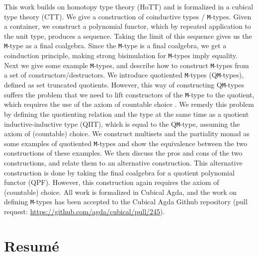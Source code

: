 \documentclass[twoside,11pt,openright]{report}
\theoremstyle{plain} %
\theoremstyle{definition}
\theoremstyle{remark}
\begin{document}
This work builds on homotopy type theory (HoTT) and is formalized in a cubical type theory (CTT). We give a construction of coinductive types / \texttt{M}-types. Given a container, we construct a polynomial functor, which by repeated application to the unit type, produces a sequence. Taking the limit of this sequence gives us the \texttt{M}-type as a final coalgebra. Since the \texttt{M}-type is a final coalgebra, we get a coinduction principle, making strong bisimulation for \texttt{M}-types imply equality. Next we give some example \texttt{M}-types, and describe how to construct \texttt{M}-types from a set of constructors/destructors. We introduce quotiented \texttt{M}-types (Q\texttt{M}-types), defined as set truncated quotients. However, this way of constructing Q\texttt{M}-types suffers the problem that we need to lift constructors of the \texttt{M}-type to the quotient, which requires the use of the axiom of countable choice \cite{DBLP:tt-in-tt}. We remedy this problem by defining the quotienting relation and the type at the same time as a quotient inductive-inductive type (QIIT), which is equal to the Q\texttt{M}-type, assuming the axiom of (countable) choice. We construct multisets and the partiality monad as some examples of quotiented \texttt{M}-types and show the equivalence between the two constructions of these examples. We then discuss the pros and cons of the two constructions, and relate them to an alternative construction. This alternative construction is done by taking the final coalgebra for a quotient polynomial functor (QPF). However, this construction again requires the axiom of (countable) choice. All work is formalized in Cubical Agda, and the work on defining \texttt{M}-types has been accepted to the Cubical Agda Github repository (pull request: \url{https://github.com/agda/cubical/pull/245}).

\chapter*{Resum\'e}
\end{document}
